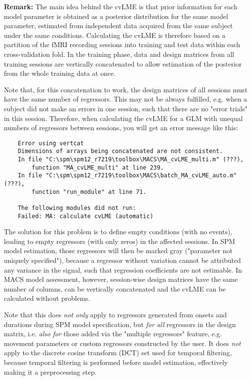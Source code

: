 \documentclass[a4paper,12pt]{article}
\begin{document}
\textbf{Remark:} The main idea behind the cvLME is that prior information for each model parameter is obtained as a posterior distribution for the same model parameter, estimated from independent data acquired from the same subject under the same conditions. Calculating the cvLME is therefore based on a partition of the fMRI recording sessions into training and test data within each cross-validation fold. In the training phase, data and design matrices from all training sessions are vertically concatenated to allow estimation of the posterior from the whole training data at once.

Note that, for this concatenation to work, the design matrices of all sessions must have the same number of regressors. This may not be always fulfilled, e.g. when a subject did not make an errors in one session, such that there are no "error trials" in this session. Therefore, when calculating the cvLME for a GLM with unequal numbers of regressors between sessions, you will get an error message like this:

\vspace{0.75em}
\begin{verbatim}
    Error using vertcat
    Dimensions of arrays being concatenated are not consistent.
    In file "C:\spm\spm12_r7219\toolbox\MACS\MA_cvLME_multi.m" (???),
        function "MA_cvLME_multi" at line 239.
    In file "C:\spm\spm12_r7219\toolbox\MACS\batch_MA_cvLME_auto.m" (???),
        function "run_module" at line 71.
    
    The following modules did not run:
    Failed: MA: calculate cvLME (automatic)
\end{verbatim}

The solution for this problem is to define empty conditions (with no events), leading to empty regressors (with only zeros) in the affected sessions. In SPM model estimation, those regressors will then be marked gray ("parameter not uniquely specified"), because a regressor without variation cannot be attributed any variance in the signal, such that regression coefficients are not estimable. In MACS model assessment, however, session-wise design matrices have the same number of columns, can be vertically concatenated and the cvLME can be calculated without problems.

Note that this does \textit{not only} apply to regressors generated from onsets and durations during SPM model specification, but \textit{for all} regressors in the design matrix, i.e. \textit{also for} those added via the "multiple regressors" feature, e.g. movement parameters or custom regressors constructed by the user. It does \textit{not} apply to the discrete cosine transform (DCT) set used for temporal filtering, because temporal filtering is performed before model estimation, effectively making it a preprocessing step.
\end{document}
